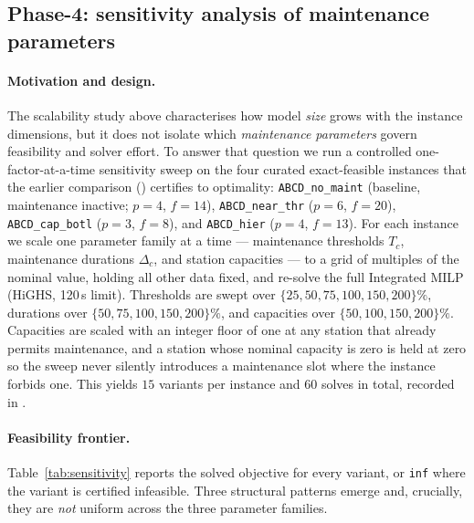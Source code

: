 \subsection{Phase-4: sensitivity analysis of maintenance parameters}
\label{subsec:phase4_sensitivity}

\paragraph{Motivation and design.}
The scalability study above characterises how model \emph{size} grows with the
instance dimensions, but it does not isolate which \emph{maintenance
parameters} govern feasibility and solver effort.  To answer that question we
run a controlled one-factor-at-a-time sensitivity sweep on the four curated
exact-feasible instances that the earlier comparison
() certifies to optimality:
\texttt{ABCD\_no\_maint} (baseline, maintenance inactive; $p=4$, $f=14$),
\texttt{ABCD\_near\_thr} ($p=6$, $f=20$),
\texttt{ABCD\_cap\_botl} ($p=3$, $f=8$), and
\texttt{ABCD\_hier} ($p=4$, $f=13$).  For each instance we scale one parameter
family at a time --- maintenance thresholds $T_c$, maintenance durations
$\Delta_c$, and station capacities --- to a grid of multiples of the nominal
value, holding all other data fixed, and re-solve the full Integrated MILP
(HiGHS, 120\,s limit).  Thresholds are swept over
$\{25,50,75,100,150,200\}\%$, durations over $\{50,75,100,150,200\}\%$, and
capacities over $\{50,100,150,200\}\%$.  Capacities are scaled with an integer
floor of one at any station that already permits maintenance, and a station
whose nominal capacity is zero is held at zero so the sweep never silently
introduces a maintenance slot where the instance forbids one.  This yields
$15$ variants per instance and $60$ solves in total, recorded in
.

\paragraph{Feasibility frontier.}
Table~\ref{tab:sensitivity} reports the solved objective for every variant, or
\texttt{inf} where the variant is certified infeasible.  Three structural
patterns emerge and, crucially, they are \emph{not} uniform across the three
parameter families.

